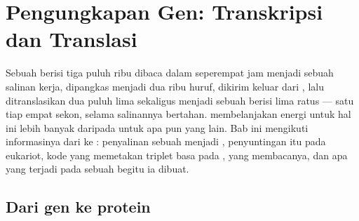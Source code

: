 \chapter{Pengungkapan Gen: Transkripsi dan Translasi}\label{ch:b1:gene-expression}

Sebuah  berisi tiga puluh ribu  dibaca dalam seperempat
jam menjadi sebuah salinan kerja, dipangkas menjadi dua ribu huruf,
dikirim keluar dari , lalu ditranslasikan dua puluh lima 
sekaligus menjadi sebuah  berisi lima ratus  --- satu
tiap empat sekon, selama salinannya bertahan.  membelanjakan energi
untuk hal ini lebih banyak daripada untuk apa pun yang lain. Bab ini
mengikuti informasinya dari  ke : penyalinan sebuah 
menjadi , penyuntingan  itu pada eukariot, kode yang memetakan
triplet basa pada ,  yang membacanya, dan apa yang
terjadi pada sebuah  begitu ia dibuat.

\section{Dari gen ke protein}

